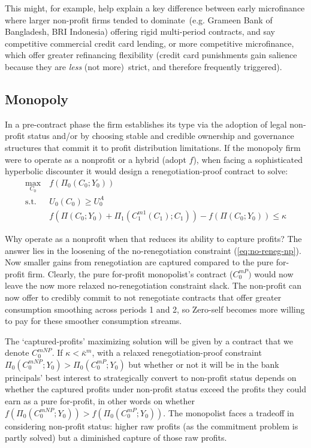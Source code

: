 \documentclass[11pt,english]{article}
\theoremstyle{plain}
\theoremstyle{definition}
\begin{document}
This might, for example, help explain a key difference between early microfinance
where  larger non-profit 
firms tended to dominate\ (e.g. Grameen Bank of Bangladesh, BRI Indonesia) offering rigid multi-period contracts, and say competitive
commercial credit card lending, or more competitive microfinance, which offer greater refinancing flexibility
(credit card punishments gain salience because they are\textit{ less}
(not more)\ strict, and therefore frequently triggered).

\subsection{Monopoly}

In a pre-contract phase the firm  establishes its type via
the adoption of legal non-profit status and/or by choosing stable and credible
ownership and governance structures that commit it to profit distribution
limitations. If the monopoly firm were to operate as a nonprofit or
a hybrid (adopt \( f\)), when facing a sophisticated hyperbolic discounter it would
design a renegotiation-proof contract to solve: 
\begin{align}
\underset{C_{0}}{\text{max}} & \ f\left(\Pi_{0}\left(C_{0};Y_{0}\right)\right)\\
\text{s.t.} & \ U_{0}\left(C_{0}\right)\geq U_{0}^{A}\\
 & \ f\left(\Pi\left(C_{0};Y_{0}\right)+\Pi_{1}\left(C_{1}^{m1}\left(C_{1}\right);C_{1}\right)\right)-f\left(\Pi\left(C_{0};Y_{0}\right)\right)\leq\kappa\label{eq:no-reneg-np}
\end{align}

Why operate as a nonprofit
when that reduces its ability to capture profits? The answer lies
in the loosening of the no-renegotiation constraint (\ref{eq:no-reneg-np}).
Now smaller gains from renegotiation are captured compared to the pure for-profit firm. Clearly, the pure for-profit monopolist's contract
($C_{0}^{mP})$ would now leave the now more relaxed no-renegotiation constraint slack.
The non-profit can now offer to credibly commit to not renegotiate
contracts that offer greater consumption smoothing across periods
1 and 2, so Zero-self becomes more willing to pay for these smoother consumption
streams.

The `captured-profits' maximizing solution will be given by a contract that we denote $C_{0}^{mNP}$. If $\kappa<\bar{\kappa}^{m}$, with a relaxed
renegotiation-proof constraint $\Pi_{0}(C_{0}^{mNP};Y_{0})>\Pi_{0}(C_{0}^{mP};Y_{0})$
but whether or not it will be in the bank principals' best interest
to strategically convert to non-profit status depends on whether the
captured profits under non-profit status exceed the profits they could
earn as a pure for-profit, in other words on whether $f\left(\Pi_{0}(C_{0}^{mNP};Y_{0})\right)>f\left(\Pi_{0}(C_{0}^{mP};Y_{0})\right)$.
The monopolist faces a tradeoff in considering non-profit status:
higher raw profits (as the commitment problem is partly solved) but
a diminished capture of those raw profits.
\end{document}
